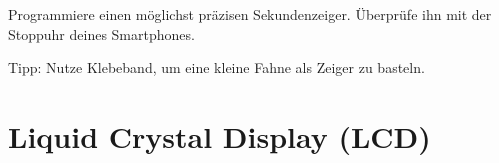 \begin{projekt}[Sekundenzeiger]\label{proj:sekundenzeiger}
	Programmiere einen möglichst präzisen Sekundenzeiger. Überprüfe ihn mit der Stoppuhr deines Smartphones.
	
	Tipp: Nutze Klebeband, um eine kleine Fahne als Zeiger zu basteln.
\end{projekt}


%	


\newpage
\section{Liquid Crystal Display (LCD)}
\label{sec:lcd}
\setcounter{aufgabennummer}{0}
\setcounter{projektnummer}{0}

